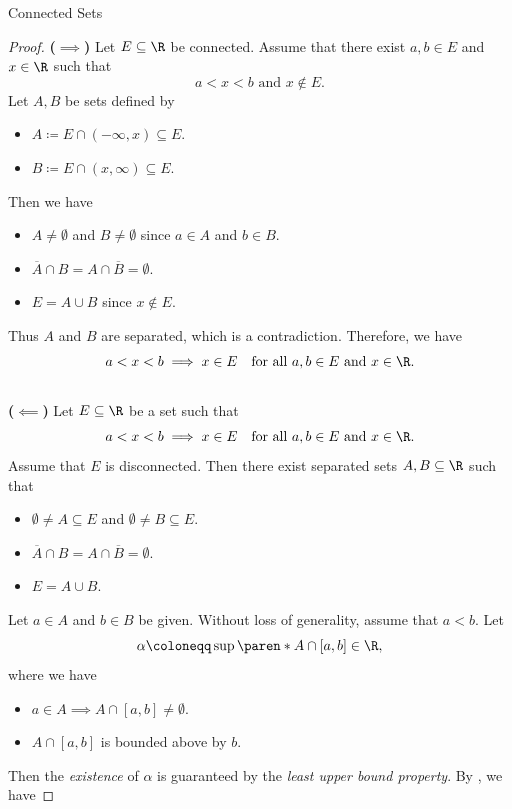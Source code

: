 \begin{section}{Connected Sets}
\begin{proof}
    \textbf{($\implies$)} Let $E \subseteq \R$ be connected. Assume that there exist $a, b \in E$ and $x \in \R$ such that
    \[
    a < x < b \text{ and } x \notin E.
    \]
    Let $A, B$ be sets defined by
    \begin{itemize}
        \item $A \coloneqq E \cap (-\infty, x) \subseteq E$.
        \item $B \coloneqq E \cap (x, \infty) \subseteq E$.
    \end{itemize}
    Then we have
    \begin{itemize}
        \item $A \neq \emptyset$ and $B \neq \emptyset$ since $a \in A$ and $b \in B$.
        \item $\overline{A} \cap B = A \cap \overline{B} = \emptyset$.
        \item $E = A \cup B$ since $x \notin E$.
    \end{itemize}
    Thus $A$ and $B$ are separated, which is a contradiction. Therefore, we have
    \[
    a < x < b \implies x \in E \quad \text{for all } a, b \in E \text{ and } x \in \R.
    \]
    \\[6mm]
    \textbf{($\impliedby$)} Let $E \subseteq \R$ be a set such that
    \[
    a < x < b \implies x \in E \quad \text{for all } a, b \in E \text{ and } x \in \R.
    \]
    Assume that $E$ is disconnected. Then there exist separated sets $A, B \subseteq \R$ such that
    \begin{itemize}
        \item $\emptyset \neq A \subseteq E$ and $\emptyset \neq B \subseteq E$.
        \item $\overline{A} \cap B = A \cap \overline{B} = \emptyset$.
        \item $E = A \cup B$.
    \end{itemize}
    Let $a \in A$ and $b \in B$ be given. Without loss of generality, assume that $a < b$. Let
    \[
    \alpha \coloneqq \sup\paren*{A \cap [a, b]} \in \R,
    \]
    where we have
    \begin{itemize}
        \item $a \in A \implies A \cap [a, b] \neq \emptyset$.
        \item $A \cap [a, b]$ is bounded above by $b$.
    \end{itemize}
    Then the \emph{existence} of $\alpha$ is guaranteed by the \emph{least upper bound property}.
    By , we have

\end{proof}
\end{section}
